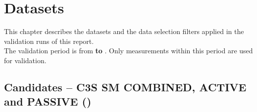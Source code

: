 \section{Datasets} \label{sec:datasets}

This chapter describes the datasets and the data selection filters applied in the validation runs of this report.
\\[1em]
\noindent The validation period is from \textbf{ to }.
Only measurements within this period are used for validation.

\subsection{Candidates -- \ac{C3S} SM COMBINED, ACTIVE and PASSIVE ()} \label{ssec:c3s}


